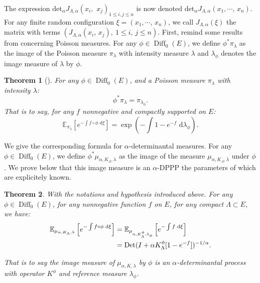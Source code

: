 \documentclass[11pt,a4paper]{amsart}
\newtheorem{Theorem}{Theorem}
\begin{document}
The expression ${{\text{det}}}_{\alpha}J_{\Lambda,\alpha}(x_i,\,\, x_j)_{1 \leq
  i,j \le n}$ is now denoted
${{\text{det}}}_{\alpha}J_{\Lambda,\alpha}(x_1,\cdots,\, x_n)$.  For any finite
random configuration $\xi=(x_1,\cdots,\, x_n)$, we call
$J_{\Lambda,\alpha}(\xi)$ the matrix with terms
$(J_{\Lambda,\alpha}(x_i,\, x_j), \ 1\le i,\, j\le n).$ First, remind
some results from \cite{MR99d:58179} concerning Poisson measures. For
any $\phi \in {\operatorname{Diff}}_0(E)$, we define $\phi^*\pi_{\lambda}$ as the
image of the Poisson measure $\pi_{\lambda}$ with intensity measure
$\lambda$ and $\lambda_{\phi}$ denotes the image measure of $\lambda$
by $\phi$.
\begin{Theorem}[]
  \label{thm:invariance_poisson}
  For any $\phi \in {\operatorname{Diff}} _0(E)$, and a Poisson measure
  $\pi_{\lambda}$ with intensity $\lambda$:
  \begin{equation*} {\phi}^*\pi_{\lambda}=\pi_{\lambda_{\phi}}.
  \end{equation*}
  That is to say, for any $f$ nonnegative and compactly supported on
  $E$:
  \begin{equation}
    \mathbb{E}_{\pi_{\lambda}}\left[ e^{-\int{f\circ \phi
          {\text{ d}}\xi}}\right] =\exp\left(-\int 1-e^{-f} {\text{ d}} \lambda_\phi\right).
  \end{equation}
\end{Theorem}
We give the corresponding formula for $\alpha$-determinantal
measures. For any $\phi \in {\operatorname{Diff}} _0(E)$, we define
$\phi^*\mu_{\alpha,K_{\Lambda},\lambda}$ as the image of the measure
$\mu_{\alpha,K_{\Lambda},\lambda}$ under $\phi$. We prove below that
this image measure is an $\alpha$-DPPP the parameters of which are
explicitely known.
\begin{Theorem}
  \label{thm:changementdeloi}
  With the notations and hypothesis introduced above. For any $\phi
  \in {\operatorname{Diff}} _0(E)$, for any nonnegative function $f$ on $E$, for any
  compact $\Lambda\subset E$, we have:
  \begin{align}
    \mathbb{E}_{\mu_{\alpha,K_{\Lambda},\lambda}}\left[
      e^{-\int{f\circ \phi {\text{ d}}\xi}}\right] &
    =\mathbb{E}_{\mu_{\alpha,K_{\Lambda}^{\phi},\lambda_{\phi}}}\left[
      e^{-\int{f{\text{ d}}\xi}}\right]\label{eq:2}\\
    &={\operatorname{Det}}(I+\alpha K_\Lambda^\phi[1-e^{-f}])^{-1/\alpha}.\notag
  \end{align}
  
  
  
  
  That is to say the image measure of $\mu_{\alpha,K,\lambda}$ by
  $\phi$ is an $\alpha$-determinantal process with operator $K^{\phi}$
  and reference measure $\lambda_\phi$.
\end{Theorem}
\end{document}
